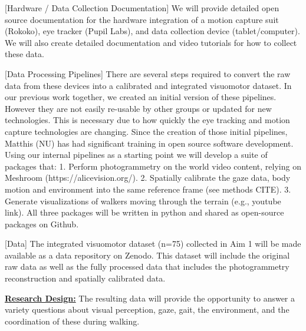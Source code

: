 [Hardware / Data Collection Documentation] We will provide detailed open source documentation for the hardware integration of a motion capture suit (Rokoko), eye tracker (Pupil Labs), and data collection device (tablet/computer). We will also create detailed documentation and video tutorials for how to collect these data.

[Data Processing Pipelines] There are several steps required to convert the raw data from these devices into a calibrated and integrated visuomotor dataset. In our previous work together, we created an initial version of these pipelines. However they are not easily re-usable by other groups or updated for new technologies. This is necessary due to how quickly the eye tracking and motion capture technologies are changing. Since the creation of those initial pipelines, Matthis (NU)
has had significant training in open source software development. Using our internal pipelines as a starting point we will develop a suite of packages that: 1. Perform photogrammetry on the world video content, relying on Meshroom (https://alicevision.org/). 2. Spatially calibrate the gaze data, body motion and environment into the same reference frame (see methods CITE). 3. Generate visualizations of walkers moving through the terrain (e.g., youtube link). All three packages will be written in
python and shared as open-source packages on Github.

[Data] The integrated visuomotor dataset (n=75) collected in Aim 1 will be made available as a data repository on Zenodo. This dataset will include the original raw data as well as the fully processed data that includes the photogrammetry reconstruction and spatially calibrated data.

\noindent\underline{\textbf{Research Design:}} The resulting data will provide the opportunity to answer a variety questions about visual perception, gaze, gait, the environment, and the coordination of these during walking.

